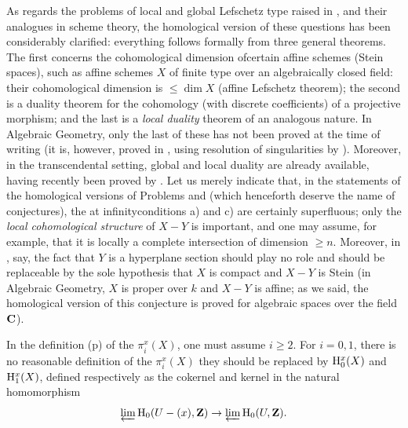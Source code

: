 As regards the problems of local and global Lefschetz type raised in , and their analogues in scheme theory, the homological version of these questions has been considerably clarified: everything follows formally from three general theorems. The first concerns the cohomological dimension of\pageoriginale certain affine schemes (\resp Stein spaces), such as affine schemes $X$ of finite type over an algebraically closed field: their cohomological dimension is $\leq\dim X$ (\og affine Lefschetz theorem\fg); the second is a duality theorem for the cohomology (with discrete coefficients) of a projective morphism; and the last is a \emph{local duality} theorem of an analogous nature. In Algebraic Geometry, only the last of these has not been proved at the time of writing (it is, however, proved in , using resolution of singularities by ). Moreover, in the transcendental setting, global and local duality are already available, having recently been proved by . Let us merely indicate that, in the statements of the homological versions of Problems  and  (which henceforth deserve the name of conjectures), the \og at infinity\fg conditions a) and c) are certainly superfluous; only the \emph{local cohomological structure} of $X-Y$ is important, and one may assume, for example, that it is locally a complete intersection of dimension $\geq n$. Moreover, in , say, the fact that $Y$ is a hyperplane section should play no role and should be replaceable by the sole hypothesis that $X$ is compact and $X-Y$ is Stein (\ie in Algebraic Geometry, $X$ is proper over $k$ and $X-Y$ is affine; as we said, the homological version of this conjecture is proved for algebraic spaces over the field $\mathbf C$).

\label{p25y}%
In the definition (p\ptbl{}) of the $\pi_i^x(X)$, one must assume $i\geq 2$. For $i=0,1$, there is no reasonable definition of the $\pi_i^x(X)$\sisi{,}{;} they should be replaced by $\mathrm H_0^x(X)$ and $\mathrm H_1^x(X)$, defined respectively as the co\sisi{-}{}kernel and kernel in the natural homomorphism
$$
\varprojlim \mathrm H_0(U-(x),\mathbf Z)\to\varprojlim\mathrm H_0(U,\mathbf Z).
$$

